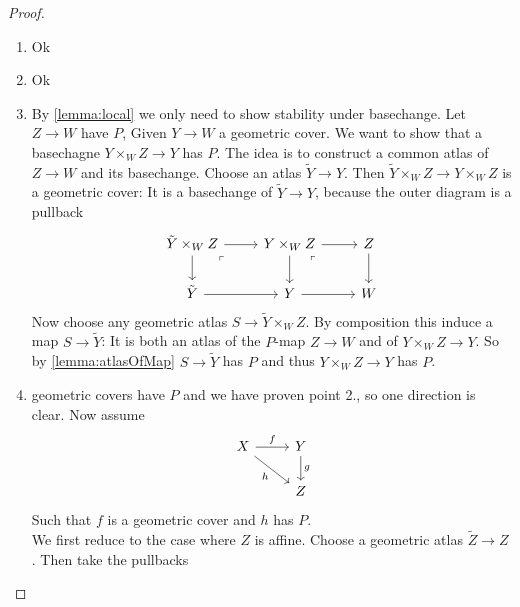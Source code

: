 \begin{proof}
	\begin{enumerate}
		\item Ok
		\item Ok
		\item By \ref{lemma:local} we only need to show stability under basechange. Let $Z \to W$ have $P$, Given $Y \to W$ a geometric cover. We want to show that a basechagne $Y \times_W Z \to Y$ has $P$. The idea is to construct a common atlas of $Z \to W$ and its basechange. Choose an atlas $\tilde Y \to Y$. Then $\tilde Y \times_W Z \to Y \times_W Z$ is a geometric cover: It is a basechange of $\tilde Y \to Y$, because the outer diagram is a pullback
		\[\begin{tikzcd}
			{\tilde Y \times_W Z} & {Y \times_W Z} & Z \\
			{\tilde Y} & Y & W
			\arrow[from=1-1, to=1-2]
			\arrow[from=1-1, to=2-1]
			\arrow["\ulcorner"{anchor=center, pos=0.125}, draw=none, from=1-1, to=2-2]
			\arrow[from=1-2, to=1-3]
			\arrow[from=1-2, to=2-2]
			\arrow["\ulcorner"{anchor=center, pos=0.125}, draw=none, from=1-2, to=2-3]
			\arrow[from=1-3, to=2-3]
			\arrow[from=2-1, to=2-2]
			\arrow[from=2-2, to=2-3]
		\end{tikzcd}\]
		Now choose any geometric atlas $S \to \tilde Y \times_W Z$. By composition this induce a map $S \to \tilde Y$: 
		It is both an atlas of the $P$-map $Z \to W$ and of $ Y\times_W Z \to Y$. So by \ref{lemma:atlasOfMap} $S \to \tilde Y$ has $P$ and thus $Y \times_W Z \to Y$ has $P$. 
		\item geometric covers have $P$ and we have proven point 2., so one direction is clear.  Now assume 
		\[\begin{tikzcd}
			X & Y \\
			& Z
			\arrow["f", from=1-1, to=1-2]
			\arrow["h"', from=1-1, to=2-2]
			\arrow["g", from=1-2, to=2-2]
		\end{tikzcd}\]
		Such that $f$ is a geometric cover and $h$ has $P$. \\
		We first reduce to the case where $Z$ is affine. Choose a geometric atlas $\tilde Z \to Z$. Then take the pullbacks

\end{enumerate}
\end{proof}
